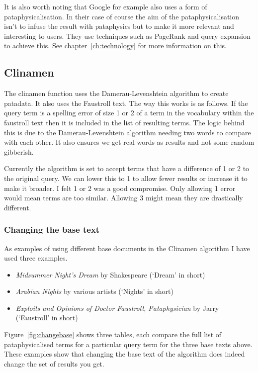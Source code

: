 It is also worth noting that Google for example also uses a form of pataphysicalisation. In their case of course the aim of the pataphysicalisation isn't to infuse the result with pataphysics but to make it more relevant and interesting to users. They use techniques such as PageRank and query expansion to achieve this. See chapter~\ref{ch:technology} for more information on this.


\subsection{Clinamen}

The clinamen function uses the Damerau-Levenshtein algorithm to create patadata. It also uses the Faustroll text. The way this works is as follows. If the query term is a spelling error of size 1 or 2 of a term in the vocabulary within the faustroll text then it is included in the list of resulting terms. The logic behind this is due to the Damerau-Levenshtein algorithm needing two words to compare with each other. It also ensures we get real words as results and not some random gibberish.

Currently the algorithm is set to accept terms that have a difference of 1 or 2 to the original query. We can lower this to 1 to allow fewer results or increase it to make it broader. I felt 1 or 2 was a good compromise. Only allowing 1 error would mean terms are too similar. Allowing 3 might mean they are drastically different.


\subsubsection{Changing the base text}
\label{s:basetext}

As examples of using different base documents in the Clinamen algorithm I have used three examples. 

\begin{itemize}
  \item \textit{Midsummer Night's Dream} by Shakespeare (`Dream' in short)
  \item \textit{Arabian Nights} by various artists (`Nights' in short)
  \item \textit{Exploits and Opinions of Doctor Faustroll, Pataphysician} by Jarry (`Faustroll' in short)
\end{itemize}

Figure~\ref{fig:changebase} shows three tables, each compare the full list of pataphysicalised terms for a particular query term for the three base texts above. These examples show that changing the base text of the algorithm does indeed change the set of results you get. 

